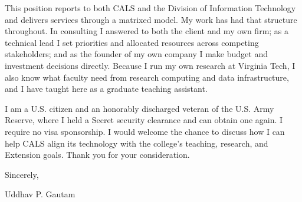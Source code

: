 \documentclass[11pt]{article}
\begin{document}
This position reports to both CALS and the Division of Information Technology and delivers services through a matrixed model. My work has had that structure throughout. In consulting I answered to both the client and my own firm; as a technical lead I set priorities and allocated resources across competing stakeholders; and as the founder of my own company I make budget and investment decisions directly. Because I run my own research at Virginia Tech, I also know what faculty need from research computing and data infrastructure, and I have taught here as a graduate teaching assistant.

I am a U.S. citizen and an honorably discharged veteran of the U.S. Army Reserve, where I held a Secret security clearance and can obtain one again. I require no visa sponsorship. I would welcome the chance to discuss how I can help CALS align its technology with the college's teaching, research, and Extension goals. Thank you for your consideration.

\vspace{8pt}
Sincerely,

\vspace{22pt}
Uddhav P. Gautam
\end{document}
